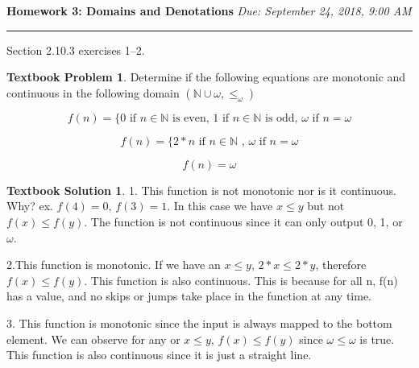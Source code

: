 \documentclass[10pt]{article}
\theoremstyle{definition}
\newtheorem{bp}{Textbook Problem}
\newtheorem{ts}{Textbook Solution}
\begin{document}
  

  

  

  \noindent

  

  \textbf{Homework 3: Domains and Denotations} \hfill \emph{Due: September 24, 2018, 9:00 AM}

  

  \hrule

  

  

  

  \vspace{.3in}

  

  

  

  Section 2.10.3 exercises 1--2.

  

  

  

  \begin{bp}

  Determine if the following equations are monotonic and continuous in the following domain $(\mathds{N} \cup {\omega}, \leq_\omega)$

  \begin{equation}
  f(n) = \{ 0 \textrm{ if } n \in \mathds{N} \textrm{ is even, } 1 \textrm{ if } n \in \mathds{N} \textrm{ is odd, } \omega \textrm{ if } n = \omega
  \end{equation}

  

  \begin{equation}
  f(n) = \{ 2*n \textrm{ if } n \in \mathds{N} \textrm{ , } \omega \textrm{ if } n = \omega 
  \end{equation}

\begin{equation}
    f(n) = \omega
\end{equation}
  

  \end{bp}

  

  \begin{ts}

  

  1. This function is not monotonic nor is it continuous. Why? ex. $f(4) = 0$, $f(3) = 1$. In this case we have $x \leq y$ but not $f(x) \leq f(y)$. The function is not continuous since it can only output 0, 1, or $\omega$.

  

  2.This function is monotonic. If we have an $x \leq y$, $2*x \leq 2*y$, therefore $f(x) \leq f(y)$. This function is also continuous. This is because for all n, f(n) has a value, and no skips or jumps take place in the function at any time.  

  3. This function is monotonic since the input is always mapped to the bottom element. We can observe for any or $x \leq y$, $f(x) \leq f(y)$ since $\omega \leq \omega$ is true. This function is also continuous since it is just a straight line. 
  \end{ts}
\end{document}
